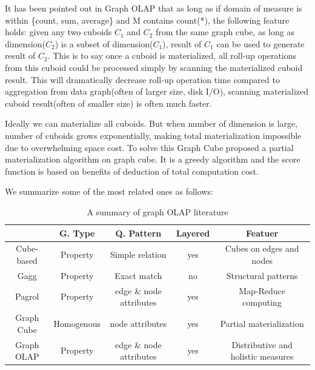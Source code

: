 It has been pointed out in  Graph OLAP \cite{DBLP:conf/icdm/ChenYZHY08} that as long as if domain of measure is within \{count, sum, average\} and M contains count(*), the following feature holds: given any two cuboids $C_1$ and $C_2$ from the same graph cube, as long as dimension($C_2$) is a subset of dimension($C_1$), result of $C_1$ can be used to generate result of $C_2$. This is to say once a cuboid is materialized, all roll-up operations from this cuboid could be processed simply by scanning the materialized cuboid result. This will dramatically decrease roll-up operation time compared to aggregation from data graph(often of larger size, disk I/O), scanning materialized cuboid result(often of smaller size) is often much faster.


Ideally we can materialize all cuboids. But when number of dimension is large, number of cuboids grows exponentially, making total materialization impossible due to overwhelming space cost. To solve this Graph Cube \cite{DBLP:conf/sigmod/ZhaoLXH11} proposed a partial materialization algorithm on graph cube. It is a greedy algorithm and the score function is based on benefits of deduction of total computation cost.

We summarize some of the most related ones as follows:
 \begin{table}
 	\footnotesize
 \begin{center}
 	\begin{tabular}{ | c | c | c | c | c |  }
 		\hline
 		 & G. Type & Q. Pattern & Layered & Featuer\\ \hline
 		 Cube-based \cite{DBLP:conf/sofsem/JakawatFL16} & Property & Simple relation & yes & Cubes on edges and nodes\\ \hline
 		 Gagg \cite{DBLP:conf/esws/MaaliCD15} & Property & Exact match & no & Structural patterns\\ \hline
 		 Pagrol \cite{DBLP:conf/icde/WangFWTAA14} & Property & edge \& node attributes & yes & Map-Reduce computing\\ \hline
 		 Graph Cube \cite{DBLP:conf/sigmod/ZhaoLXH11} & Homogenous  & node attributes & yes & Partial materialization\\ \hline
 		 Graph OLAP \cite{DBLP:conf/icdm/ChenYZHY08} & Property & edge \& node attributes & yes & Distributive and holistic measures\\ \hline
 		
 	\end{tabular}
 	\end {center}
 	\caption{A summary of graph OLAP literature}
\end{table}


